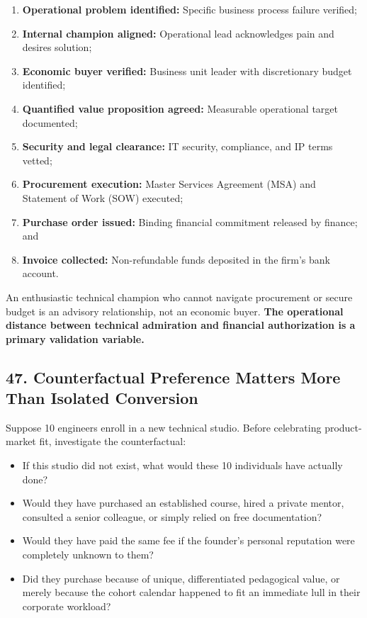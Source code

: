 \begin{enumerate}
    \item \textbf{Operational problem identified:} Specific business process failure verified;
    \item \textbf{Internal champion aligned:} Operational lead acknowledges pain and desires solution;
    \item \textbf{Economic buyer verified:} Business unit leader with discretionary budget identified;
    \item \textbf{Quantified value proposition agreed:} Measurable operational target documented;
    \item \textbf{Security and legal clearance:} IT security, compliance, and IP terms vetted;
    \item \textbf{Procurement execution:} Master Services Agreement (MSA) and Statement of Work (SOW) executed;
    \item \textbf{Purchase order issued:} Binding financial commitment released by finance; and
    \item \textbf{Invoice collected:} Non-refundable funds deposited in the firm's bank account.
\end{enumerate}

An enthusiastic technical champion who cannot navigate procurement or secure budget is an advisory relationship, not an economic buyer. \textbf{The operational distance between technical admiration and financial authorization is a primary validation variable.}

\subsection*{47. Counterfactual Preference Matters More Than Isolated Conversion}

Suppose 10 engineers enroll in a new technical studio. Before celebrating product-market fit, investigate the counterfactual:
\begin{itemize}
    \item If this studio did not exist, what would these 10 individuals have actually done?
    \item Would they have purchased an established course, hired a private mentor, consulted a senior colleague, or simply relied on free documentation?
    \item Would they have paid the same fee if the founder's personal reputation were completely unknown to them?
    \item Did they purchase because of unique, differentiated pedagogical value, or merely because the cohort calendar happened to fit an immediate lull in their corporate workload?
\end{itemize}

